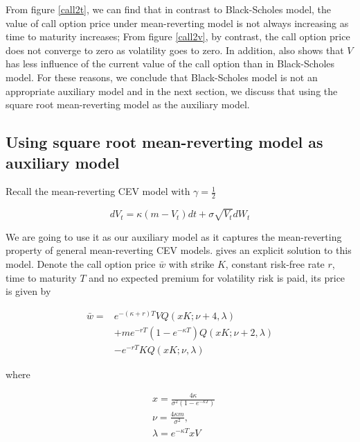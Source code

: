 From figure \ref{call2t}, we can find that in contrast to Black-Scholes model, the value of call option price under mean-reverting model is not always increasing as time to maturity increases; From figure \ref{call2v}, by contrast, the call option price does not converge to zero as volatility goes to zero. In addition, \cite{grunbichler_valuing_1996} also shows that $V$ has less influence of the current value of the call option than in Black-Scholes model. For these reasons, we conclude that Black-Scholes model is not an appropriate auxiliary model and in the next section, we discuss that using the square root mean-reverting model as the auxiliary model.

\subsection{Using square root mean-reverting model as auxiliary model}

Recall the mean-reverting CEV model with $\gamma=\frac{1}{2}$

\begin{equation}
    d V_t=\kappa(m - V_t) d t+\sigma \sqrt{V_t} d W_t
\end{equation}

We are going to use it as our auxiliary model as it captures the mean-reverting property of general mean-reverting CEV models. \cite{grunbichler_valuing_1996} gives an explicit solution to this model. Denote the call option price $\bar{w}$ with strike $K$, constant risk-free rate $r$, time to maturity $T$ and no expected premium for volatility risk is paid, its price is given by

\begin{equation}\label{aux call price}
    \begin{aligned}
        \bar{w}=&  e^{ -(\kappa+r) T} V Q(x K ; \nu+4, \lambda) \\
        &+ m e^{-r T}(1-e^{-\kappa T}) Q(xK ; \nu+2, \lambda) \\
        &-e^{-r T} K Q(x K; \nu, \lambda)
        \end{aligned}
\end{equation}

\noindent where

$$
\begin{aligned}\label{para}
    &x=\frac{4 \kappa}{\sigma^{2}(1-e^{-\kappa T})} \\
    &\nu=\frac{4 \kappa m}{\sigma^{2}}, \\
    &\lambda= e^{-\kappa T}x V
    \end{aligned}
$$


